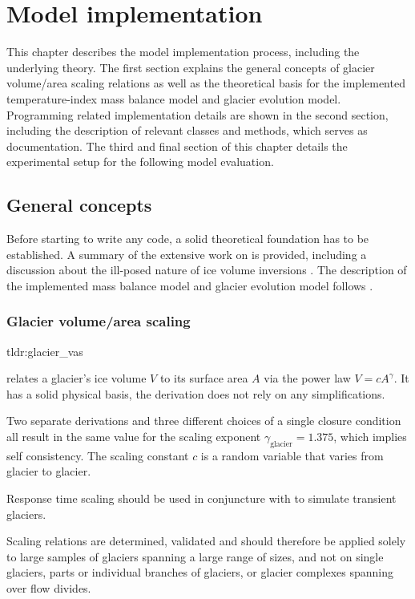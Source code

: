 \chapter{Model implementation}\label{chap:methods}
\thispagestyle{plain}

This chapter describes the model implementation process, including the underlying theory.
The first section explains the general concepts of glacier volume/area scaling relations as well as the theoretical basis for the implemented temperature-index mass balance model and glacier evolution model. Programming related implementation details are shown in the second section, including the description of relevant classes and methods, which serves as documentation. The third and final section of this chapter details the experimental setup for the following model evaluation.

\section{General concepts} %
\label{sec:general_concepts}

    Before starting to write any code, a solid theoretical foundation has to be established. A summary of the extensive work on \vas{} \citep{Bahr1997, Bahr1997a, Bahr1997b, Bahr2015} is provided,  including a discussion about the ill-posed nature of ice volume inversions \citep{Bahr2014}. The description of the implemented mass balance model and glacier evolution model follows \citet{Marzeion2012b}.

    \subsection{Glacier volume/area scaling} %
    \label{sub:glacier_volume_area_scaling}

        \begin{tldrbox}{tldr:glacier_vas}
            \item \Vas{} relates a glacier's ice volume $V$ to its surface area $A$ via the power law $V=cA^\gamma$. It has a solid physical basis, the derivation does not rely on any simplifications.
            \item Two separate derivations and three different choices of a single closure condition all result in the same value for the scaling exponent $\gamma_\text{glacier} = 1.375$, which implies self consistency. The scaling constant $c$ is a random variable that varies from glacier to glacier.
            \item Response time scaling should be used in conjuncture with \vas{} to simulate transient glaciers.
            \item Scaling relations are determined, validated and should therefore be applied solely to large samples of glaciers spanning a large range of sizes, and not on single glaciers, parts or individual branches of glaciers, or glacier complexes spanning over flow divides.
        \end{tldrbox}

